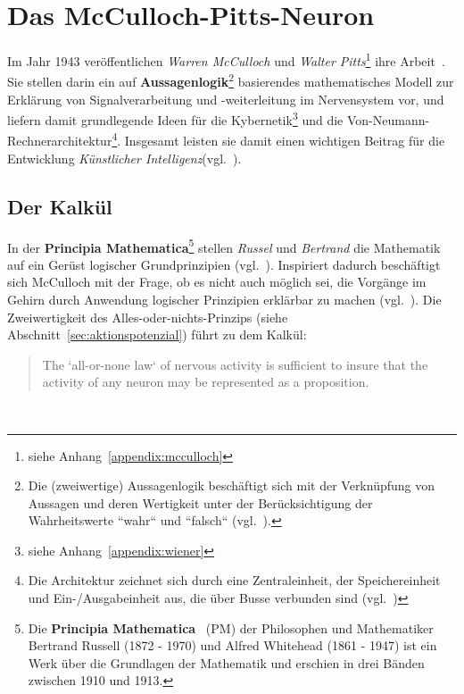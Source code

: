 \section{Das McCulloch-Pitts-Neuron}\label{sec:mcpneuron}

Im Jahr 1943 veröffentlichen \textit{Warren McCulloch} und \textit{Walter Pitts}\footnote{
    siehe Anhang~\ref{appendix:mcculloch}
} ihre Arbeit~\cite{MP43}.
Sie stellen darin ein auf \textbf{Aussagenlogik}\footnote{
    Die (zweiwertige) Aussagenlogik beschäftigt sich mit der Verknüpfung von Aussagen und deren Wertigkeit unter der Berücksichtigung der Wahrheitswerte ``wahr`` und ``falsch`` (vgl.~\cite[2]{Rau88}).
} basierendes mathematisches Modell zur Erklärung von Signalverarbeitung und  -weiterleitung im Nervensystem vor, und liefern damit grundlegende Ideen für die Kybernetik\footnote{
    siehe Anhang~\ref{appendix:wiener}
} und die Von-Neumann-Rechnerarchitektur\footnote{
    Die Architektur zeichnet sich durch eine Zentraleinheit, der Speichereinheit und Ein-/Ausgabeinheit aus, die über Busse verbunden sind (vgl.~\cite[230]{OV00})
}. Insgesamt leisten sie damit einen wichtigen Beitrag für die Entwicklung \textit{Künstlicher Intelligenz}(vgl.~\cite[1]{Arb19}).


\subsection{Der Kalkül}\label{sec:mcpkalkül}

In der \textbf{Principia Mathematica}\footnote{
    Die \textbf{Principia Mathematica}~\cite{PW27} (PM) der Philosophen und Mathematiker Bertrand Russell (1872 - 1970) und Alfred Whitehead (1861 - 1947) ist ein Werk über die Grundlagen der Mathematik und erschien in drei Bänden zwischen 1910 und 1913.
} stellen \textit{Russel} und \textit{Bertrand} die Mathematik auf ein Gerüst logischer Grundprinzipien (vgl.~\cite[225]{She26}). Inspiriert dadurch beschäftigt sich McCulloch mit der Frage, ob es nicht auch möglich sei, die Vorgänge im Gehirn durch Anwendung logischer Prinzipien erklärbar zu machen (vgl.~\cite[4]{Arb19}). Die Zweiwertigkeit des Alles-oder-nichts-Prinzips (siehe Abschnitt~\ref{sec:aktionspotenzial}) führt zu dem Kalkül:\\

\blockquote[{\cite[100]{MP43}}]{
    The `all-or-none law` of nervous activity is sufficient to insure that the activity of any neuron may be represented as a proposition.
}\\


